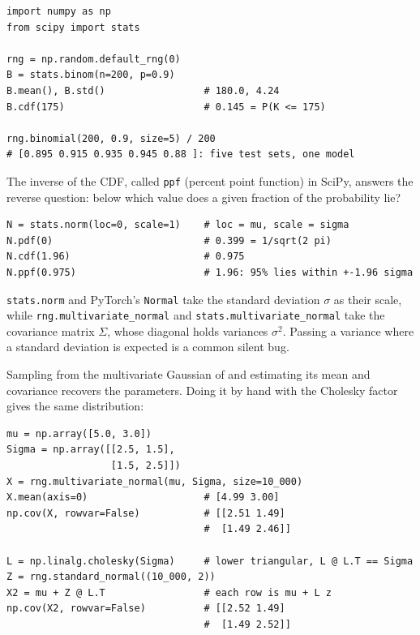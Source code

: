 \begin{lstlisting}
import numpy as np
from scipy import stats

rng = np.random.default_rng(0)
B = stats.binom(n=200, p=0.9)
B.mean(), B.std()                 # 180.0, 4.24
B.cdf(175)                        # 0.145 = P(K <= 175)

rng.binomial(200, 0.9, size=5) / 200
# [0.895 0.915 0.935 0.945 0.88 ]: five test sets, one model
\end{lstlisting}

The inverse of the CDF, called \texttt{ppf} (percent point function) in
SciPy, answers the reverse question: below which value does a given
fraction of the probability lie?

\begin{lstlisting}
N = stats.norm(loc=0, scale=1)    # loc = mu, scale = sigma
N.pdf(0)                          # 0.399 = 1/sqrt(2 pi)
N.cdf(1.96)                       # 0.975
N.ppf(0.975)                      # 1.96: 95% lies within +-1.96 sigma
\end{lstlisting}

\begin{warning}
  \texttt{stats.norm} and PyTorch's \texttt{Normal} take the standard
  deviation $\sigma$ as their scale, while
  \texttt{rng.multivariate\_normal} and \texttt{stats.multivariate\_normal}
  take the covariance matrix $\Sigma$, whose diagonal holds variances
  $\sigma^2$. Passing a variance where a standard deviation is expected
  is a common silent bug.
\end{warning}

Sampling from the multivariate Gaussian of  and
estimating its mean and covariance recovers the parameters. Doing it by
hand with the Cholesky factor gives the same distribution:

\begin{lstlisting}
mu = np.array([5.0, 3.0])
Sigma = np.array([[2.5, 1.5],
                  [1.5, 2.5]])
X = rng.multivariate_normal(mu, Sigma, size=10_000)
X.mean(axis=0)                    # [4.99 3.00]
np.cov(X, rowvar=False)           # [[2.51 1.49]
                                  #  [1.49 2.46]]

L = np.linalg.cholesky(Sigma)     # lower triangular, L @ L.T == Sigma
Z = rng.standard_normal((10_000, 2))
X2 = mu + Z @ L.T                 # each row is mu + L z
np.cov(X2, rowvar=False)          # [[2.52 1.49]
                                  #  [1.49 2.52]]
\end{lstlisting}

